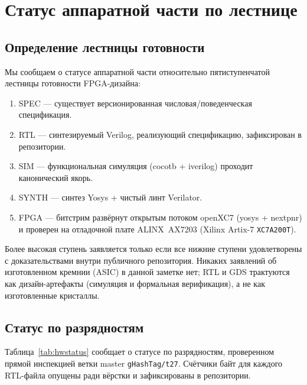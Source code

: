 \documentclass[11pt,a4paper]{article}
\theoremstyle{plain}
\begin{document}
\section{Статус аппаратной части по лестнице}\label{sec:hw}

\subsection{Определение лестницы готовности}
Мы сообщаем о статусе аппаратной части относительно пятиступенчатой лестницы
готовности FPGA-дизайна:
\begin{enumerate}\setlength{\itemsep}{1pt}
\item SPEC --- существует версионированная числовая/поведенческая спецификация.
\item RTL --- синтезируемый Verilog, реализующий спецификацию, зафиксирован в репозитории.
\item SIM --- функциональная симуляция (cocotb + iverilog) проходит канонический якорь.
\item SYNTH --- синтез Yosys + чистый линт Verilator.
\item FPGA --- битстрим развёрнут открытым потоком openXC7 (yosys + nextpnr) и проверен на отладочной плате ALINX~AX7203 (Xilinx Artix-7 \texttt{XC7A200T}).
\end{enumerate}
Более высокая ступень заявляется только если все нижние ступени удовлетворены с
доказательствами внутри публичного репозитория. Никаких заявлений об
изготовленном кремнии (ASIC) в данной заметке нет; RTL и GDS трактуются как
дизайн-артефакты (симуляция и формальная верификация), а не как изготовленные
кристаллы.

\subsection{Статус по разрядностям}\label{sec:hw-status}
Таблица~\ref{tab:hwstatus} сообщает о статусе по разрядностям, проверенном
прямой инспекцией ветки master \texttt{gHashTag/t27}.
Счётчики байт для каждого RTL-файла опущены ради вёрстки и
зафиксированы в репозитории.
\end{document}
